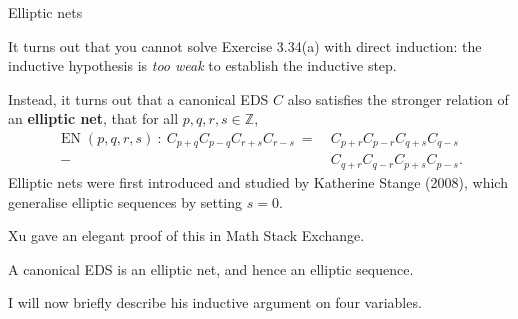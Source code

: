 \documentclass[10pt]{beamer}
\begin{document}
\begin{frame}[t]{Elliptic nets}

It turns out that you cannot solve Exercise 3.34(a) with direct induction: the inductive hypothesis is \emph{too weak} to establish the inductive step.

\vspace{0.5cm} Instead, it turns out that a canonical EDS $ C $ also satisfies the stronger relation of an \textbf{elliptic net}, that for all $ p, q, r, s \in \mathbb{Z} $,
\begin{align*}
\operatorname{EN}(p, q, r, s) \ : \ C_{p + q}C_{p - q}C_{r + s}C_{r - s}
\ = & \ C_{p + r}C_{p - r}C_{q + s}C_{q - s} \\
\ - & \ C_{q + r}C_{q - r}C_{p + s}C_{p - s}.
\end{align*}
Elliptic nets were first introduced and studied by Katherine Stange (2008), which generalise elliptic sequences by setting $ s = 0 $.

\vspace{0.5cm} Xu gave an elegant proof of this in Math Stack Exchange.

\begin{theorem}[Xu, 2024]
A canonical EDS is an elliptic net, and hence an elliptic sequence.
\end{theorem}

I will now briefly describe his inductive argument on four variables.

\end{frame}
\end{document}
